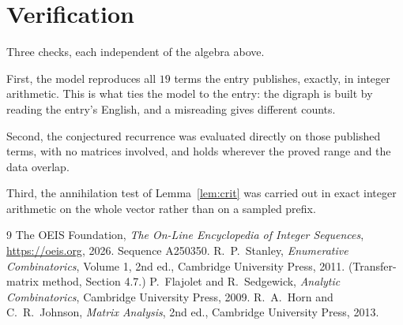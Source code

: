 \documentclass[11pt,a4paper]{article}
\theoremstyle{plain}
\theoremstyle{definition}
\begin{document}
\section{Verification}

Three checks, each independent of the algebra above.

First, the model reproduces all $19$ terms the entry publishes, exactly, in integer
arithmetic. This is what ties the model to the entry: the digraph is built by reading the
entry's English, and a misreading gives different counts.

Second, the conjectured recurrence was evaluated directly on those published terms, with no
matrices involved, and holds wherever the proved range and the data overlap.

Third, the annihilation test of Lemma~\ref{lem:crit} was carried out in exact integer
arithmetic on the whole vector rather than on a sampled prefix.

\begin{thebibliography}{9}
 The OEIS Foundation, \emph{The On-Line Encyclopedia of Integer
Sequences}, \url{https://oeis.org}, 2026. Sequence A250350.
 R.~P.~Stanley, \emph{Enumerative Combinatorics}, Volume 1, 2nd ed.,
Cambridge University Press, 2011. (Transfer-matrix method, Section 4.7.)
 P.~Flajolet and R.~Sedgewick, \emph{Analytic Combinatorics}, Cambridge
University Press, 2009.
 R.~A.~Horn and C.~R.~Johnson, \emph{Matrix Analysis}, 2nd ed., Cambridge
University Press, 2013.
\end{thebibliography}
\end{document}
